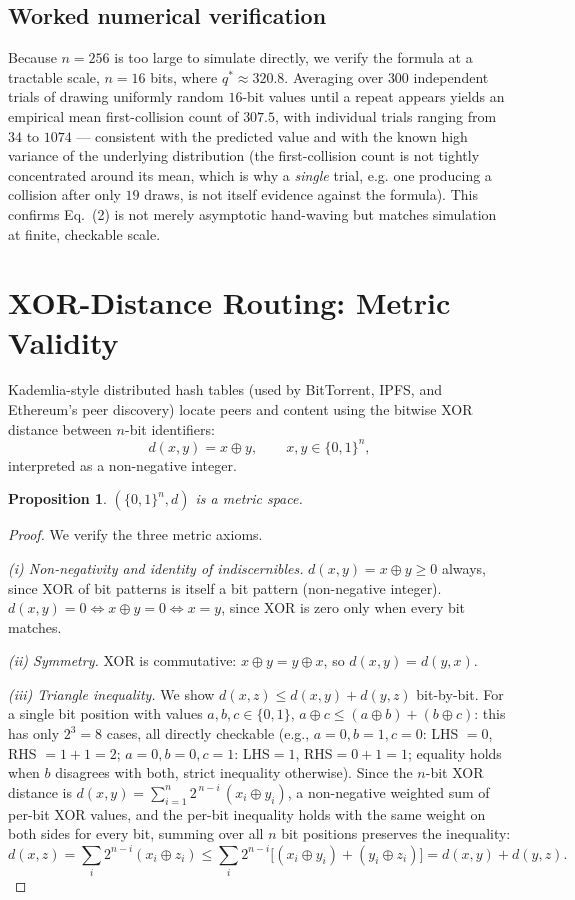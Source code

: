 \documentclass[10pt,journal,compsoc]{IEEEtran}
\newtheorem{proposition}{Proposition}
\begin{document}
\subsection{Worked numerical verification}
Because $n=256$ is too large to simulate directly, we verify the formula at a tractable scale, $n=16$ bits, where $q^{*} \approx 320.8$. Averaging over $300$ independent trials of drawing uniformly random $16$-bit values until a repeat appears yields an empirical mean first-collision count of $307.5$, with individual trials ranging from $34$ to $1074$ — consistent with the predicted value and with the known high variance of the underlying distribution (the first-collision count is not tightly concentrated around its mean, which is why a \emph{single} trial, e.g. one producing a collision after only $19$ draws, is not itself evidence against the formula). This confirms Eq.~(2) is not merely asymptotic hand-waving but matches simulation at finite, checkable scale.

\section{XOR-Distance Routing: Metric Validity}
Kademlia-style distributed hash tables (used by BitTorrent, IPFS, and Ethereum's peer discovery) locate peers and content using the bitwise XOR distance between $n$-bit identifiers:
\begin{equation}
    d(x,y) = x \oplus y, \qquad x,y \in \{0,1\}^n,
\end{equation}
interpreted as a non-negative integer.

\begin{proposition}
$(\{0,1\}^n, d)$ is a metric space.
\end{proposition}
\begin{proof}
We verify the three metric axioms.

\emph{(i) Non-negativity and identity of indiscernibles.} $d(x,y)=x\oplus y \ge 0$ always, since XOR of bit patterns is itself a bit pattern (non-negative integer). $d(x,y)=0 \iff x\oplus y = 0 \iff x=y$, since XOR is zero only when every bit matches.

\emph{(ii) Symmetry.} XOR is commutative: $x\oplus y = y \oplus x$, so $d(x,y)=d(y,x)$.

\emph{(iii) Triangle inequality.} We show $d(x,z) \le d(x,y) + d(y,z)$ bit-by-bit. For a single bit position with values $a,b,c\in\{0,1\}$, $a\oplus c \le (a\oplus b) + (b\oplus c)$: this has only $2^3=8$ cases, all directly checkable (e.g., $a=0,b=1,c=0$: LHS $=0$, RHS $=1+1=2$; $a=0,b=0,c=1$: LHS$=1$, RHS$=0+1=1$; equality holds when $b$ disagrees with both, strict inequality otherwise). Since the $n$-bit XOR distance is $d(x,y)=\sum_{i=1}^{n} 2^{\,n-i}\,(x_i \oplus y_i)$, a non-negative weighted sum of per-bit XOR values, and the per-bit inequality holds with the same weight on both sides for every bit, summing over all $n$ bit positions preserves the inequality:
\begin{equation}
    d(x,z) = \sum_i 2^{n-i}(x_i\oplus z_i) \le \sum_i 2^{n-i}\big[(x_i\oplus y_i)+(y_i\oplus z_i)\big] = d(x,y)+d(y,z).
\end{equation}
\end{proof}
\end{document}
